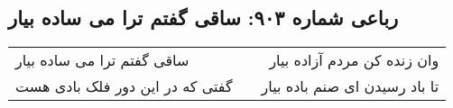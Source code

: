 \begin{center}
\section*{رباعی شماره ۹۰۳: ساقی گفتم ترا می ساده بیار}
\label{sec:0903}
\begin{longtable}{l p{0.5cm} r}
ساقی گفتم ترا می ساده بیار
&&
وان زنده کن مردم آزاده بیار
\\
گفتی که در این دور فلک بادی هست
&&
تا باد رسیدن ای صنم باده بیار
\\
\end{longtable}
\end{center}
